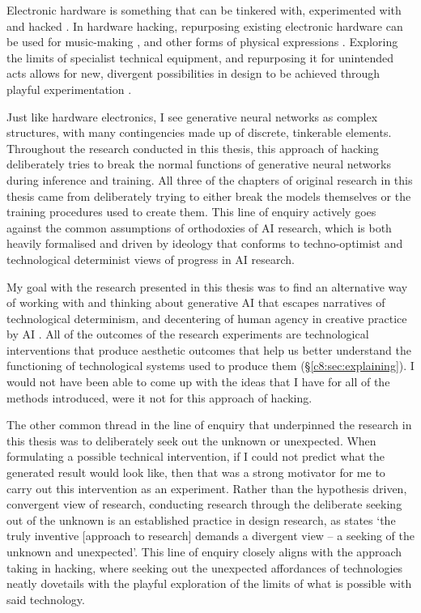 Electronic hardware is something that can be tinkered with, experimented with and hacked \citep{collins2004hardware, grand2004hardware}. 
In hardware hacking, repurposing existing electronic hardware can be used for music-making \citep{collins2009handmade}, and other forms of physical expressions \citep{hartmann2008hacking}.
Exploring the limits of specialist technical equipment, and repurposing it for unintended acts allows for new, divergent possibilities in design to be achieved through playful experimentation \citep{goddard2015playful}.

Just like hardware electronics, I see generative neural networks as complex structures, with many contingencies made up of discrete, tinkerable elements.
Throughout the research conducted in this thesis, this approach of hacking deliberately tries to break the normal functions of generative neural networks during inference and training. 
All three of the chapters of original research in this thesis came from deliberately trying to either break the models themselves or the training procedures used to create them.
This line of enquiry actively goes against the common assumptions of orthodoxies of AI research, which is both heavily formalised and driven by ideology \citep{sias2021ideology} that conforms to techno-optimist \citep{andreesen2023techno} and technological determinist \citep{drew2016technological} views of progress in AI research. 

My goal with the research presented in this thesis was to find an alternative way of working with and thinking about generative AI that escapes narratives of technological determinism, and decentering of human agency in creative practice by AI \citep{zeilinger2021tactical}.
All of the outcomes of the research experiments are technological interventions that produce aesthetic outcomes that help us better understand the functioning of technological systems used to produce them (\S \ref{c8:sec:explaining}). 
I would not have been able to come up with the ideas that I have for all of the methods introduced, were it not for this approach of hacking.

The other common thread in the line of enquiry that underpinned the research in this thesis was to deliberately seek out the unknown or unexpected. 
When formulating a possible technical intervention, if I could not predict what the generated result would look like, then that was a strong motivator for me to carry out this intervention as an experiment. 
Rather than the hypothesis driven, convergent view of research, conducting research through the deliberate seeking out of the unknown is an established practice in design research, as \cite{downton2003design} states `the truly inventive [approach to research] demands a divergent view – a seeking of the unknown and unexpected'.
This line of enquiry closely aligns with the approach taking in hacking, where seeking out the unexpected affordances of technologies neatly dovetails with the playful exploration of the limits of what is possible with said technology.

